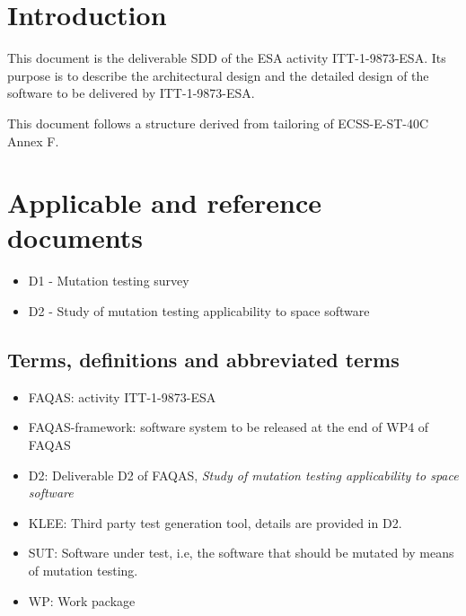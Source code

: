 
\chapter{Introduction}

This document is the deliverable SDD of the ESA activity ITT-1-9873-ESA. Its purpose is to describe the architectural design and the detailed design of the software to be delivered by ITT-1-9873-ESA. 

This document follows a structure derived from tailoring of ECSS-E-ST-40C Annex F.




\chapter{Applicable and reference documents}

\begin{itemize}
\item{D1 - Mutation testing survey}
\item{D2 - Study of mutation testing applicability to space software}
\end{itemize}

\section{Terms, definitions and abbreviated terms}

\begin{itemize}
\item{FAQAS}: activity ITT-1-9873-ESA
\item{FAQAS-framework}: software system to be released at the end of WP4 of FAQAS
\item{D2}: Deliverable D2 of FAQAS, \emph{Study of mutation testing applicability to space software}
\item{KLEE}: Third party test generation tool, details are provided in D2.
\item{SUT}: Software under test, i.e, the software that should be mutated by means of mutation testing.
\item{WP}: Work package
\end{itemize}

\clearpage

